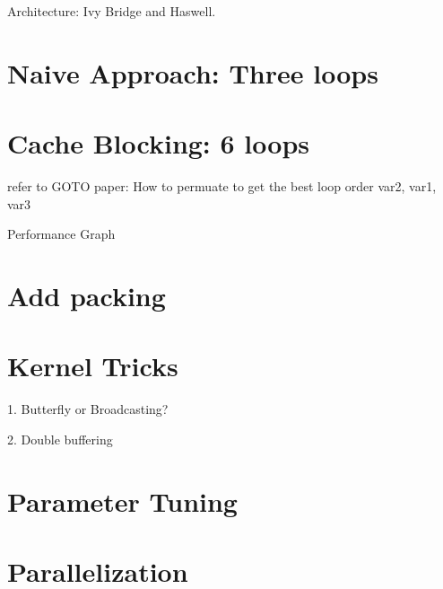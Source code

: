 Architecture: Ivy Bridge and Haswell.

\section{Naive Approach: Three loops}


\section{Cache Blocking: 6 loops}

refer to GOTO paper: How to permuate to get the best loop order
var2, var1, var3


Performance Graph

\section{Add packing}


\section{Kernel Tricks}
1. Butterfly or Broadcasting?

2. Double buffering


\section{Parameter Tuning}




\section{Parallelization}







